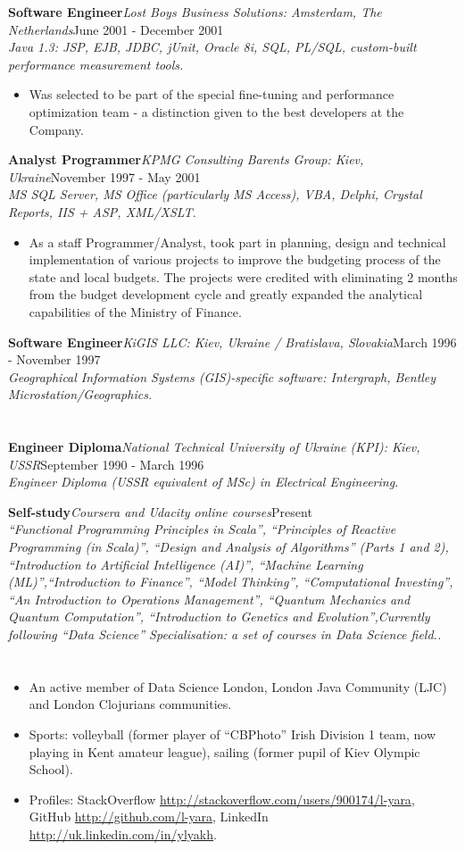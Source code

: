 \documentclass{res}
\newcommand{\jobdes}[4]{\needspace{3\baselineskip}%
{\noindent \bf #3\hspace{2ex}}{{\em \small #1}}{\hfill #2}\\{{\em \small #4.}}}
\newcommand{\osection}[1]{\section{\sc {\Large \textbf{#1}\\}} \vspace{0.30cm}}
\begin{document}
\begin{resume}
\jobdes {Lost Boys Business Solutions: Amsterdam, The Netherlands}{June 2001 - December 2001}{Software Engineer}
{Java 1.3: JSP, EJB, JDBC, jUnit, Oracle 8i, SQL, PL/SQL, custom-built performance measurement tools}
\begin{itemize} \itemsep -2pt %
 \item Was selected to be part of the special fine-tuning and performance optimization team - a distinction given to the best developers at the Company.
\end{itemize}

\jobdes {KPMG Consulting Barents Group: Kiev, Ukraine}{November 1997 - May 2001}{Analyst Programmer}
{MS SQL Server, MS Office (particularly MS Access), VBA, Delphi, Crystal Reports, IIS + ASP, XML/XSLT}
\begin{itemize}
 \item As a staff Programmer/Analyst, took part in planning, design and technical implementation of various projects to improve the budgeting process of the state and local budgets.  The projects were credited with eliminating 2 months from the budget development cycle and greatly expanded the analytical capabilities of the Ministry of Finance.
\end{itemize}

\jobdes {KiGIS LLC: Kiev, Ukraine / Bratislava, Slovakia}{March 1996 - November 1997}{Software Engineer}
{Geographical Information Systems (GIS)-specific software: Intergraph, Bentley Microstation/Geographics}

\osection{EDUCATION}
\jobdes {National Technical University of Ukraine (KPI): Kiev, USSR}{September 1990 - March 1996}{Engineer Diploma}
 {Engineer Diploma (USSR equivalent of MSc) in Electrical Engineering}

\jobdes {Coursera and Udacity online courses}{Present}{Self-study}
{``Functional Programming Principles in Scala'', ``Principles of Reactive Programming (in Scala)'', ``Design and Analysis of Algorithms'' (Parts 1 and 2), ``Introduction to Artificial Intelligence (AI)'', ``Machine Learning (ML)'',``Introduction to Finance'', ``Model Thinking'', ``Computational Investing'', ``An Introduction to Operations Management'', ``Quantum Mechanics and Quantum Computation'', ``Introduction to Genetics and Evolution'',Currently following ``Data Science'' Specialisation: a set of courses in Data Science field.}

\osection{SPECIALS}
\begin{itemize}
 \item An active member of Data Science London, London Java Community (LJC) and London Clojurians communities.
 \item Sports: volleyball (former player of ``CBPhoto'' Irish Division 1 team, now playing in Kent amateur league), sailing (former pupil of Kiev Olympic School).
 \item Profiles: StackOverflow \url{http://stackoverflow.com/users/900174/l-yara}, GitHub \url{http://github.com/l-yara}, LinkedIn \url{http://uk.linkedin.com/in/ylyakh}.
\end{itemize}


\end{resume}
\end{document}
